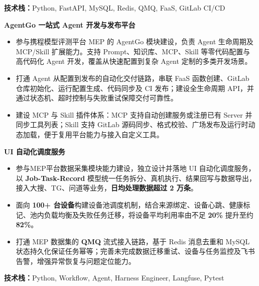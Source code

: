 \vspace{-3pt}

\textbf{技术栈：}Python, FastAPI, MySQL, Redis, QMQ, FaaS, GitLab CI/CD

\textbf{AgentGo 一站式 Agent 开发与发布平台}
\begin{itemize}
	\item 参与携程模型评测平台 MEP 的 AgentGo 模块建设，负责 Agent 生命周期及 MCP/Skill 扩展能力。支持 Prompt、知识库、MCP、Skill 等零代码配置与高代码化 Agent 开发，覆盖从快速配置到复杂 Agent 定制的多类开发场景。
	\item 打通 Agent 从配置到发布的自动化交付链路，串联 FaaS 函数创建、GitLab 仓库初始化、运行配置生成、代码同步及 CI 发布；建设全生命周期 API，并通过状态机、超时控制与失败重试保障交付可靠性。
	\item 建设 MCP 与 Skill 插件体系：MCP 支持自动创建服务或注册已有 Server 并同步工具列表；Skill 支持 GitLab 源码同步、格式校验、广场发布及运行时动态加载，便于复用平台能力与接入自定义工具。
\end{itemize}

\textbf{UI 自动化调度服务}
\begin{itemize}
	\item 参与MEP平台数据采集模块能力建设，独立设计并落地 UI 自动化调度服务，以 \textbf{Job-Task-Record} 模型统一任务拆分、真机执行、结果回写与数据导出，接入大搜、TG、问道等业务，\textbf{日均处理数据超过 2 万条}。
	\item 面向 \textbf{100+ 台设备}构建设备池调度机制，结合来源绑定、设备心跳、健康标记、池内负载均衡及失败任务迁移，将设备平均利用率由不足 \textbf{20\%} 提升至约 \textbf{82\%}。
	\item 打通 MEP 数据集的 \textbf{QMQ} 流式接入链路，基于 Redis 消息去重和 MySQL 状态持久化保证任务幂等；完善未完成数据迁移重试、设备与任务监控及飞书告警，增强异常恢复与问题定位能力。
\end{itemize}



\textbf{技术栈：}Python, Workflow, Agent, Harness Engineer, Langfuse, Pytest

